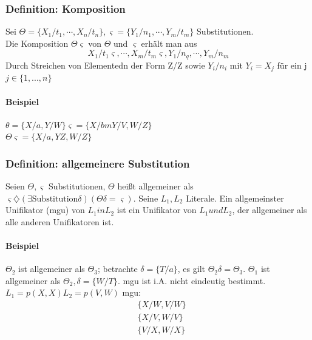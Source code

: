 \documentclass[12pt, a4paper]{article}
\begin{document}
\subsubsection*{Definition: Komposition}

Sei $\Theta = \{ X_1 / t_1, \cdots, X_n / t_n \}, \varsigma = \{ Y_1 / n_1, \cdots, Y_m / t_m \}$ Substitutionen. \\
Die Komposition $\Theta\varsigma$ von $\Theta$ und $\varsigma$ erhält man aus 
\begin{equation}
X_1 / t_1\varsigma, \cdots, X_m / t_m\varsigma, Y_1 / n_q, \cdots, Y_m / n_m
\end{equation}
Durch Streichen von Elementedn der Form Z/Z sowie $Y_i / n_i$ mit $Y_i = X_j$ für ein j$j \in \{1, ..., n\}$

\paragraph{Beispiel} $\theta= \{ X/a,  Y/W \} \varsigma=\{X/ bm Y/ V, W/Z \}$ \\
$\Theta\varsigma = \{ X/a, YZ, W/Z \}$

\subsubsection*{Definition: allgemeinere Substitution}
Seien $\Theta, \varsigma$ Substitutionen, $\Theta$ heißt allgemeiner als $\varsigma \diamondsuit (\exists \text{Substitution} \delta)(\Theta \delta = \varsigma)$.
Seine $L_1, L_2$ Literale. Ein allgemeinster Unifikator (mgu) von $L_1 in L_2$ ist ein Unifikator von $L_1 und L_2$, der allgemeiner als alle anderen Unifikatoren ist.

\paragraph{Beispiel} $\Theta_2$  ist allgemeiner als $\Theta_3$; betrachte $\delta = \{T / a\}$, es gilt $\Theta_2\delta = \Theta_3$. $\Theta_1$ ist allgemeiner als $\Theta_2, \delta = \{ W / T \}$. mgu ist i.A. nicht eindeutig bestimmt. $L_1 = p(X,X) L_2 = p(V,W)$
mgu: \\
\begin{equation}
\begin{split}
&\{ X/W, V/W \} \\
&\{ X / V, W/V\} \\
&\{ V/X, W/X \}
\end{split}
\end{equation}
\end{document}
